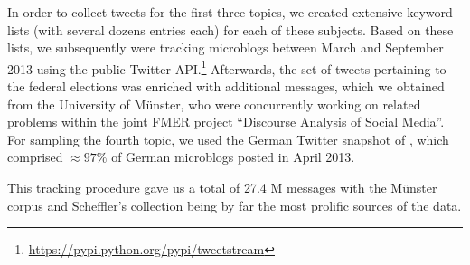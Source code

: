 In order to collect tweets for the first three topics, we created
extensive keyword lists (with several dozens entries each) for each of
these subjects.  Based on these lists, we subsequently were tracking
microblogs between March and September 2013 using the public Twitter
API.\footnote{\url{https://pypi.python.org/pypi/tweetstream}}
Afterwards, the set of tweets pertaining to the federal elections was
enriched with additional messages, which we obtained from the
University of M\"unster, who were concurrently working on related
problems within the joint FMER project ``Discourse Analysis of Social
Media''.  For sampling the fourth topic, we used the German Twitter
snapshot of \citet{Scheffler:14}, which comprised $\approx97\%$ of
German microblogs posted in April 2013.

This tracking procedure gave us a total of 27.4 M messages with the
M\"unster corpus and Scheffler's collection being by far the most
prolific sources of the data.







